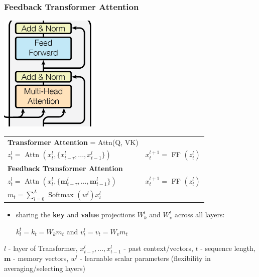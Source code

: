 \documentclass{beamer}
\begin{document}
\begin{frame}
    \frametitle{Feedback Transformer Attention}
    \begin{center}
        \includegraphics[scale=1.2]{img/cross_attention.png}

        \begin{tabular}{ l r }
        \scriptsize{\textbf{Transformer Attention} = Attn(Q, VK)} \\
        $ z_{t}^{l} = $ Attn $( x_{t}^{l}, \{ x_{t - \tau}^{l}, ...,  x_{t - 1}^{l} \} )$ & $ x_{t}^{l + 1} = $ FF $( z_{t}^{l} )$ \\
        \hline
        \scriptsize{\textbf{Feedback Transformer Attention}} \\
        $ z_{t}^{l} = $ Attn $( x_{t}^{l}, \{ \textbf{m}_{t - \tau}^{l}, ..., \textbf{m}_{t - 1}^{l} \} )$ & $ x_{t}^{l + 1} = $ FF $( z_{t}^{l} )$ \\
        $m_t = \sum_{l=0}^{L} $ Softmax $(w^l) x_t^l$
        \end{tabular}
    \end{center}
    \begin{itemize}
        \item \scriptsize{sharing the \textbf{key} and \textbf{value} projections $W_k^l$ and $W_v^l$ across all layers:

        $ k_l^t = k_t = W_k m_t$ and $v_t^l = v_t = W_v m_t $}
    \end{itemize}
    \begin{center}
        \scriptsize{$l$ - layer of Transformer, $ x_{t - \tau}^{l}, ...,  x_{t - 1}^{l} $ - past context/vectors, $t$ - sequence length}, $\textbf{m}$ - memory vectors, $w^l$ - learnable scalar parameters (flexibility in averaging/selecting layers)
    \end{center}
\end{frame}
\end{document}
